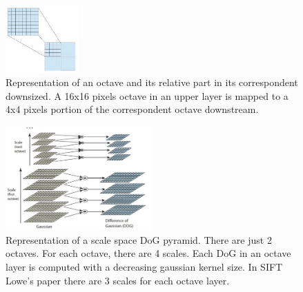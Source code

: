 \documentclass[aps,letterpaper,10pt]{revtex4}
\begin{document}
\begin{figure}[h]
	\begin{center}
		\includegraphics[width=0.25\textwidth]{imgs/octave_downsize.jpg}
	\end{center}
\caption{Representation of an octave and its relative part in its correspondent downsized. A 16x16 pixels octave in an upper layer is mapped to a 4x4 pixels portion of the correspondent octave downstream.}
\end{figure}

\begin{figure}[h]
	\begin{center}
		\includegraphics[width=0.5\textwidth]{imgs/dog_pyramid.jpg}
	\end{center}
\caption{Representation of a scale space DoG pyramid. There are just 2 octaves. For each octave, there are 4 scales. Each DoG in an octave layer is computed with a decreasing gaussian kernel size. In SIFT Lowe's paper there are 3 scales for each octave layer.}
\end{figure}
\end{document}
